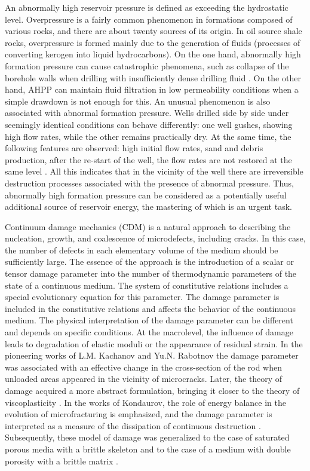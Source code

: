 \documentclass[article,authoryear,jpm]{beg_39}             %
\begin{document}
An abnormally high reservoir pressure is defined as exceeding the hydrostatic level.
Overpressure is a fairly common phenomenon in formations composed of various rocks, and there are about twenty sources of its origin.
In oil source shale rocks, overpressure is formed mainly due to the generation of fluids (processes of converting kerogen into liquid hydrocarbons).
On the one hand, abnormally high formation pressure can cause catastrophic phenomena, such as collapse of the borehole walls when drilling with insufficiently dense drilling fluid \cite{Ma2015, Li}.
On the other hand, AHPP can maintain fluid filtration in low permeability conditions when a simple drawdown is not enough for this.
An unusual phenomenon is also associated with abnormal formation pressure.
Wells drilled side by side under seemingly identical conditions can behave differently: one well gushes, showing high flow rates, while the other remains practically dry.
At the same time, the following features are observed: high initial flow rates, sand and debris production, after the re-start of the well, the flow rates are not restored at the same level \cite{Alekseev}.
All this indicates that in the vicinity of the well there are irreversible destruction processes associated with the presence of abnormal pressure.
Thus, abnormally high formation pressure can be considered as a potentially useful additional source of reservoir energy, the mastering of which is an urgent task.

Continuum damage mechanics (CDM) is a natural approach to describing the nucleation, growth, and coalescence of microdefects, including cracks.
In this case, the number of defects in each elementary volume of the medium should be sufficiently large.
The essence of the approach is the introduction of a scalar or tensor damage parameter into the number of thermodynamic parameters of the state of a continuous medium.
The system of constitutive relations includes a special evolutionary equation for this parameter.
The damage parameter is included in the constitutive relations and affects the behavior of the continuous medium.
The physical interpretation of the damage parameter can be different and depends on specific conditions.
At the macrolevel, the influence of damage leads to degradation of elastic moduli or the appearance of residual strain.
In the pioneering works of L.M.
Kachanov and Yu.N.
Rabotnov the damage parameter was associated with an effective change in the cross-section of the rod when unloaded areas appeared in the vicinity of microcracks.
Later, the theory of damage acquired a more abstract formulation, bringing it closer to the theory of viscoplasticity \cite{Lemaitre, Murakami}.
In the works of Kondaurov, the role of energy balance in the evolution of microfracturing is emphasized, and the damage parameter is interpreted as a measure of the dissipation of continuous destruction \cite{Kondaurov2002}.
Subsequently, these model of damage was generalized to the case of saturated porous media with a brittle skeleton \cite{Izvekov} and to the case of a medium with double porosity with a brittle matrix \cite{Izvekov2020}.
\end{document}
